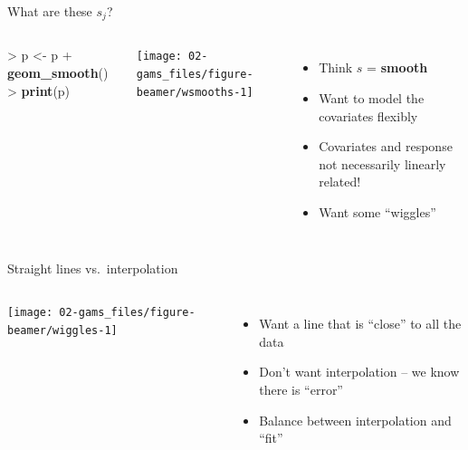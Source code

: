 \documentclass[10pt,ignorenonframetext,compress, aspectratio=169]{beamer}
\newenvironment{Shaded}{\begin{snugshade}}{\end{snugshade}}
\newcommand{\KeywordTok}[1]{\textcolor[rgb]{0.13,0.29,0.53}{\textbf{{#1}}}}
\newcommand{\StringTok}[1]{\textcolor[rgb]{0.31,0.60,0.02}{{#1}}}
\newcommand{\NormalTok}[1]{{#1}}
\providecommand{\tightlist}{%
  \setlength{\itemsep}{0pt}\setlength{\parskip}{0pt}}
\newcommand{\columnsbegin}{\begin{columns}}
\newcommand{\columnsend}{\end{columns}}
\begin{document}
\begin{frame}[fragile]{What are these \(s_j\)?}

\columnsbegin
{}

\begin{Shaded}
\begin{Highlighting}[]
\NormalTok{>}\StringTok{ }\NormalTok{p <-}\StringTok{ }\NormalTok{p +}\StringTok{ }\KeywordTok{geom_smooth}\NormalTok{()}
\NormalTok{>}\StringTok{ }\KeywordTok{print}\NormalTok{(p)}
\end{Highlighting}
\end{Shaded}

\begin{center}\texttt{[image: 02-gams\_files/figure-beamer/wsmooths-1]} \end{center}


\begin{itemize}
\tightlist
\item
  Think \(s\) = \textbf{smooth}
\item
  Want to model the covariates flexibly
\item
  Covariates and response not necessarily linearly related!
\item
  Want some ``wiggles''
\end{itemize}

\columnsend

\end{frame}

\begin{frame}{Straight lines vs.~interpolation}

\columnsbegin
{}

\begin{center}\texttt{[image: 02-gams\_files/figure-beamer/wiggles-1]} \end{center}


\begin{itemize}
\tightlist
\item
  Want a line that is ``close'' to all the data
\item
  Don't want interpolation -- we know there is ``error''
\item
  Balance between interpolation and ``fit''
\end{itemize}

\columnsend

\end{frame}
\end{document}
